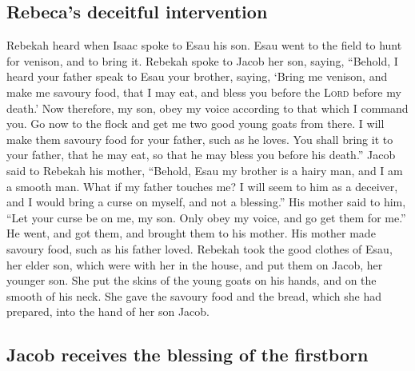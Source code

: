 \hypertarget{rebecas-deceitful-intervention}{%
\subsection{Rebeca's deceitful
intervention}\label{rebecas-deceitful-intervention}}

 Rebekah heard when Isaac spoke to Esau his son. Esau went
to the field to hunt for venison, and to bring it. 
Rebekah spoke to Jacob her son, saying, ``Behold, I heard your father
speak to Esau your brother, saying,  `Bring me venison,
and make me savoury food, that I may eat, and bless you before the
\textsc{Lord} before my death.'  Now therefore, my son,
obey my voice according to that which I command you.  Go
now to the flock and get me two good young goats from there. I will make
them savoury food for your father, such as he loves.  You
shall bring it to your father, that he may eat, so that he may bless you
before his death.''  Jacob said to Rebekah his mother,
``Behold, Esau my brother is a hairy man, and I am a smooth man.
 What if my father touches me? I will seem to him as a
deceiver, and I would bring a curse on myself, and not a blessing.''
 His mother said to him, ``Let your curse be on me, my
son. Only obey my voice, and go get them for me.''  He
went, and got them, and brought them to his mother. His mother made
savoury food, such as his father loved.  Rebekah took the
good clothes of Esau, her elder son, which were with her in the house,
and put them on Jacob, her younger son.  She put the
skins of the young goats on his hands, and on the smooth of his neck.
 She gave the savoury food and the bread, which she had
prepared, into the hand of her son Jacob.

\hypertarget{jacob-receives-the-blessing-of-the-firstborn}{%
\subsection{Jacob receives the blessing of the
firstborn}\label{jacob-receives-the-blessing-of-the-firstborn}}


